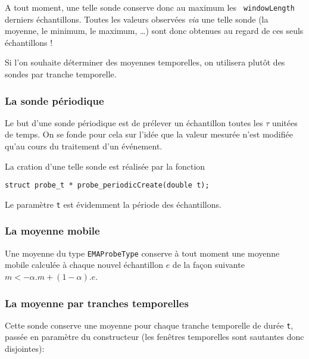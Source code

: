 \documentclass{article}
\begin{document}
   A tout moment, une telle sonde conserve donc au maximum les {\tt
windowLength} derniers échantillons. Toutes les valeurs observées
{\em via} une telle sonde (la moyenne, le minimum, le maximum, \ldots)
sont donc obtenues au regard de ces seuls échantillons !

   Si l'on souhaite déterminer des moyennes temporelles, on utilisera
plutôt des sondes par tranche temporelle.

%
\subsubsection{La sonde périodique}

   Le but d'une sonde périodique est de prélever un échantillon toutes
les $\tau$ unitées de temps. On se fonde pour cela sur l'idée que la
valeur mesurée n'est modifiée qu'au cours du traitement d'un
événement.

   La cration d'une telle sonde est réalisée par la fonction 

\begin{verbatim}
struct probe_t * probe_periodicCreate(double t);
\end{verbatim}

   Le paramètre {\tt t} est évidemment la période des échantillons.

%
\subsubsection{La moyenne mobile}

   Une moyenne du type \lstinline!EMAProbeType! conserve à tout moment
une moyenne mobile calculée à chaque nouvel échantillon $e$ de la façon
suivante $m <- \alpha . m + (1 - \alpha).e$.

%
\subsubsection{La moyenne par tranches temporelles}

   Cette sonde conserve une moyenne pour chaque tranche temporelle de
durée {\tt t}, passée en paramètre du constructeur (les fenêtres
temporelles sont sautantes donc disjointes):
\end{document}
